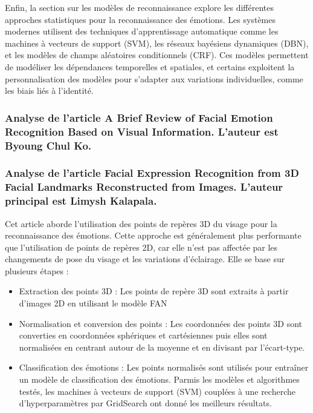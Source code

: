 \documentclass{rapport}
\begin{document}
Enfin, la section sur les modèles de reconnaissance explore les différentes
approches statistiques pour la reconnaissance des émotions. Les systèmes modernes
utilisent des techniques d'apprentissage automatique comme les machines à vecteurs
de support (SVM), les réseaux bayésiens dynamiques (DBN), et les modèles de champs
aléatoires conditionnels (CRF). Ces modèles permettent de modéliser les dépendances
temporelles et spatiales, et certains exploitent la personnalisation des modèles
pour s’adapter aux variations individuelles, comme les biais liés à l'identité.

\subsubsection{Analyse de l'article \cite{koBriefReviewFacial2018} A Brief Review of Facial Emotion Recognition Based on Visual Information. L'auteur est Byoung Chul Ko.}

\subsubsection{Analyse de l'article \cite{kalapalaFacialExpressionRecognition2020} Facial Expression Recognition from 3D Facial  Landmarks Reconstructed from Images. L'auteur principal est Limysh Kalapala.}

Cet article aborde l'utilisation des points de repères 3D du visage pour la reconnaissance des émotions.
Cette approche est généralement plus performante que l'utilisation de points de repères 2D, car elle n'est pas
affectée par les changements de pose du visage et les variations d'éclairage. Elle se base sur plusieurs étapes :\\
\begin{itemize}
    \item Extraction des points 3D : Les points de repère 3D sont extraits à partir d'images 2D en utilisant le modèle FAN
    \item Normalisation et conversion des points : Les coordonnées des points 3D sont converties en coordonnées sphériques et cartésiennes
          puis elles sont normalisées en centrant autour de la moyenne et en divisant par l'écart-type.
    \item Classification des émotions : Les points normalisés sont utilisés pour entraîner un modèle de classification des émotions. Parmis
          les modèles et algorithmes testés, les machines à vecteurs de support (SVM) couplées à une recherche d'hyperparamètres par GridSearch
          ont donné les meilleurs résultats.
\end{itemize}
\end{document}
